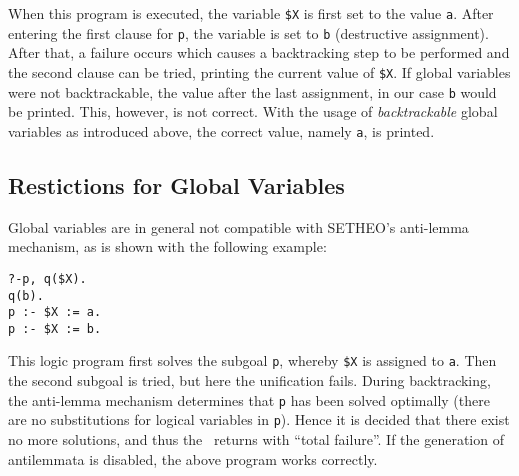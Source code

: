 When this program is executed, the variable {\tt \$X} is first set to
the value {\tt a}. After entering the first clause for {\tt p}, the variable
is set to {\tt b} (destructive assignment). After that, a failure occurs
which causes a backtracking step to be performed and the second clause
can be tried, printing the current value of {\tt \$X}.
If global variables were not
backtrackable, the value after the last assignment, in our case {\tt b}
would be printed. This, however, is not correct.
With the usage of {\em backtrackable\/} global variables as introduced
above, the correct value, namely {\tt a}, is printed.

\subsection{Restictions for Global Variables}

Global variables are in general not compatible with SETHEO's
anti-lemma mechanism, as is shown with the following example:

\begin{verbatim}
?-p, q($X).
q(b).
p :- $X := a.
p :- $X := b.
\end{verbatim}

This logic program first solves the subgoal {\tt p}, whereby {\tt \$X}
is assigned to {\tt a}. Then the second subgoal is tried, but here
the unification fails. During backtracking, the anti-lemma mechanism
determines that {\tt p} has been solved optimally (there are no substitutions
for logical variables in {\tt p}). Hence it is decided that there exist no
more solutions, and thus the \SAM\ returns with ``total failure''.
If the generation of antilemmata is disabled, the above program works
correctly.
